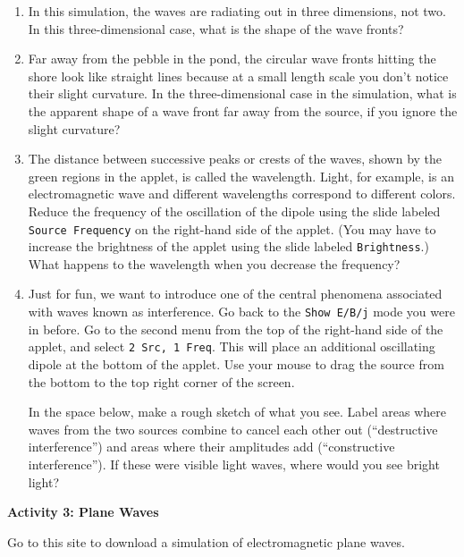 \begin{enumerate}[labparts]

\item In this simulation, the waves are radiating out in three dimensions, not two.  In this three-dimensional case, what is the shape of the wave fronts?
\answerspace{1cm}

\item Far away from the pebble in the pond, the circular wave fronts hitting the shore look like straight lines because at a small length scale you don't notice their slight curvature. 
In the three-dimensional case in the simulation, what is the apparent shape of a wave front far away from the source, if you ignore the slight curvature?
\answerspace{1cm}


\pagebreak[2]

\item The distance between successive peaks or crests of the waves, shown by the green regions in the
applet, is called the wavelength.  
Light, for example, is an electromagnetic wave and different wavelengths correspond 
to different colors.
Reduce the frequency of the oscillation of the dipole using the slide labeled
\texttt{Source Frequency} on the right-hand side of the applet.
(You may have to increase the brightness of the applet using the slide labeled
\texttt{Brightness}.)
What happens to the wavelength when you decrease the frequency?
\answerspace{1.0cm}


\item Just for fun, we want to introduce one of the central phenomena associated
with waves known as interference.
Go back to the \texttt{Show E/B/j} mode you were in before. 
Go to the second menu from the top of the right-hand side of the applet, and select
\texttt{2 Src, 1 Freq}.
This will place an additional oscillating dipole at the bottom of the applet.  Use your mouse to drag the source from the bottom to the top right corner of the screen.

In the space below, make a rough sketch of what you see.  Label areas where waves from the two sources combine to cancel each other out (``destructive interference'') and areas where their amplitudes add (``constructive interference'').  If these were visible light waves, where would you see bright light?
\answerspace{40mm}

\end{enumerate}

\textbf{Activity 3: Plane Waves}

Go to this site to download a simulation of electromagnetic plane waves.

